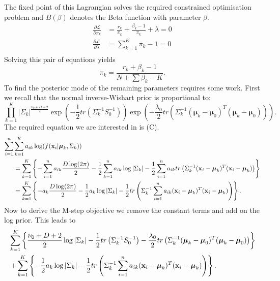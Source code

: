\documentclass[12pt,english]{article}
\begin{document}
The fixed point of this Lagrangian solves the required constrained optimisation problem and $B(\beta)$ denotes the Beta function with parameter $\beta$.
\begin{equation}
\begin{split}
\frac{\partial\mathcal{L}}{\partial \pi_k} &= \frac{r_k}{\pi_k} + \frac{\beta_k - 1}{\pi_k} + \lambda = 0\\
\frac{\partial\mathcal{L}}{\partial \lambda} &= \sum_{k=1}^{K}\pi_k - 1 = 0\\
\end{split}
\end{equation}
Solving this pair of equations yields
\begin{equation}
\pi_k = \frac{r_k + \beta_k - 1}{N + \sum \beta_k - K}.
\end{equation}
To find the posterior mode of the remaining parameters requires some work.
First we recall that the normal inverse-Wishart prior is proportional to:
\begin{equation}
\prod_{k=1}^{K}|\Sigma_{k}|^{\frac{\nu_0 + D + 2}{2}}\exp \left(-\frac{1}{2}tr(\Sigma_{k}^{-1}S_0^{-1})\right)\exp \left(-\frac{\lambda_0}{2}tr(\Sigma_{k}^{-1}(\boldsymbol{\mu}_k - \boldsymbol{\mu}_0)^{T}(\boldsymbol{\mu}_k - \boldsymbol{\mu}_0))\right).
\end{equation}
The required equation we are interested in is (C).
\begin{equation}
\begin{split}
\sum_{i=1}^{n} &\sum_{k=1}^{K}a_{ik}\log (f({\bf x}_i|\boldsymbol{\mu}_k, \Sigma_k))\\
& = \sum_{k=1}^{K}\left\{- \sum_{i=1}^{n} a_{ik}\frac{D\log(2\pi)}{2} - \frac{1}{2}\sum_{k=1}^{n}a_{ik}\log|\Sigma_{k}| - \frac{1}{2}\sum_{i=1}^{n}a_{ik}tr\left(\Sigma_{k}^{-1}({\bf x}_i - \boldsymbol{\mu}_k)^{T}({\bf x}_i - \boldsymbol{\mu}_k)\right)\right\}\\
& = \sum_{k=1}^{K}\left\{- a_k\frac{D\log(2\pi)}{2} - \frac{1}{2}a_k\log|\Sigma_{k}| - \frac{1}{2}tr\left(\Sigma_{k}^{-1}\sum_{i=1}^{n}a_{ik}({\bf x}_i - \boldsymbol{\mu}_k)^{T}({\bf x}_i - \boldsymbol{\mu}_k)\right)\right\}.
\end{split}
\end{equation}
Now to derive the M-step objective we remove the constant terms and add on the log prior. This leads to
\begin{equation}
\begin{split}
 &\sum_{k=1}^{K} \left\{\frac{\nu_0 + D + 2 }{2} \log|\Sigma_k|  - \frac{1}{2} tr \left(\Sigma_{k}^{-1} S_0^{-1}\right) - \frac{\lambda_0}{2} tr \left( \Sigma_{k}^{-1}(\boldsymbol{\mu}_k - \boldsymbol{\mu}_0)^T(\boldsymbol{\mu}_k - \boldsymbol{\mu}_0) \right)\right\} \\
 & + \sum_{k=1}^{K} \left\{- \frac{1}{2}a_k\log|\Sigma_{k}| - \frac{1}{2} tr\left(\Sigma_{k}^{-1}\sum_{i=1}^{n}a_{ik}({\bf x}_i - \boldsymbol{\mu}_k)^{T}({\bf x}_i - \boldsymbol{\mu}_k)\right) \right\}.
\end{split}
\end{equation}
\end{document}

